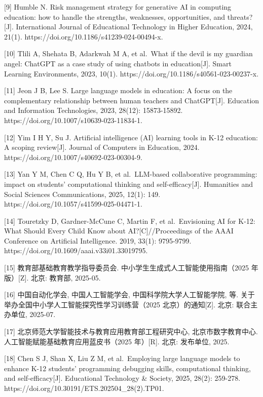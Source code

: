 {[}9{]} Humble N. Risk management strategy for generative AI in computing education: how to handle the strengths, weaknesses, opportunities, and threats?{[}J{]}. International Journal of Educational Technology in Higher Education, 2024, 21(1). https://doi.org/10.1186/s41239-024-00494-x.

{[}10{]} Tlili A, Shehata B, Adarkwah M A, et al.~What if the devil is my guardian angel: ChatGPT as a case study of using chatbots in education{[}J{]}. Smart Learning Environments, 2023, 10(1). https://doi.org/10.1186/s40561-023-00237-x.

{[}11{]} Jeon J B, Lee S. Large language models in education: A focus on the complementary relationship between human teachers and ChatGPT{[}J{]}. Education and Information Technologies, 2023, 28(12): 15873-15892. https://doi.org/10.1007/s10639-023-11834-1.

{[}12{]} Yim I H Y, Su J. Artificial intelligence (AI) learning tools in K-12 education: A scoping review{[}J{]}. Journal of Computers in Education, 2024. https://doi.org/10.1007/s40692-023-00304-9.

{[}13{]} Yan Y M, Chen C Q, Hu Y B, et al.~LLM-based collaborative programming: impact on students' computational thinking and self-efficacy{[}J{]}. Humanities and Social Sciences Communications, 2025, 12(1): 149. https://doi.org/10.1057/s41599-025-04471-1.

{[}14{]} Touretzky D, Gardner-McCune C, Martin F, et al.~Envisioning AI for K-12: What Should Every Child Know about AI?{[}C{]}//Proceedings of the AAAI Conference on Artificial Intelligence. 2019, 33(1): 9795-9799. https://doi.org/10.1609/aaai.v33i01.33019795.

{[}15{]} 教育部基础教育教学指导委员会. 中小学生生成式人工智能使用指南（2025 年版）{[}Z{]}. 北京: 教育部, 2025-05.

{[}16{]} 中国自动化学会, 中国人工智能学会, 中国科学院大学人工智能学院, 等. 关于举办全国中小学人工智能探究性学习训练营（2025 北京）的通知{[}Z{]}. 北京: 联合主办单位, 2025-07.

{[}17{]} 北京师范大学智能技术与教育应用教育部工程研究中心, 北京市数字教育中心. 人工智能赋能基础教育应用蓝皮书（2025 年）{[}R{]}. 北京: 发布单位, 2025.

{[}18{]} Chen S J, Shan X, Liu Z M, et al.~Employing large language models to enhance K-12 students' programming debugging skills, computational thinking, and self-efficacy{[}J{]}. Educational Technology \& Society, 2025, 28(2): 259-278. https://doi.org/10.30191/ETS.202504\_28(2).TP01.


